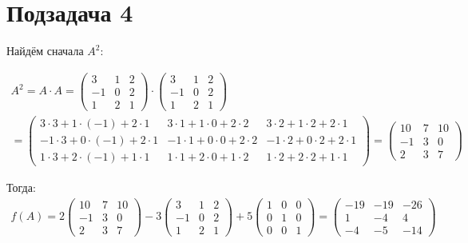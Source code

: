 \documentclass[12pt, a4paper]{article}
\begin{document}
    \newpage
    \newpage
    
    \section{Подзадача 4}

    Найдём сначала $A^2$:

    \begin{multline}
        A^2 = A \cdot A = \left(\begin{matrix}
            3 & 1 & 2 \\
            -1 & 0 & 2 \\
            1 & 2 & 1
        \end{matrix}\right) \cdot \left(\begin{matrix}
            3 & 1 & 2 \\
            -1 & 0 & 2 \\
            1 & 2 & 1
        \end{matrix}\right) \\ = \left(\begin{matrix}
            3\cdot 3+1\cdot \left(-1\right)+2\cdot 1 & 3\cdot 1+1\cdot 0+2\cdot 2 & 3\cdot 2+1\cdot 2+2\cdot 1 \\
            -1\cdot 3+0\cdot \left(-1\right)+2\cdot 1 & -1\cdot 1+0\cdot 0+2\cdot 2 & -1\cdot 2+0\cdot 2+2\cdot 1 \\
            1\cdot 3+2\cdot \left(-1\right)+1\cdot 1 & 1\cdot 1+2\cdot 0+1\cdot 2 & 1\cdot 2+2\cdot 2+1\cdot 1
            \end{matrix}\right) = \left(\begin{matrix}
                10 & 7 & 10 \\
                -1 & 3 & 0 \\
                2 & 3 & 7
            \end{matrix}\right)
    \end{multline}

    Тогда:
    \begin{multline}
        f(A) = 2 \left(\begin{matrix}
            10 & 7 & 10 \\
            -1 & 3 & 0 \\
            2 & 3 & 7
        \end{matrix}\right) − 3 \left(\begin{matrix}
            3 & 1 & 2 \\
            -1 & 0 & 2 \\
            1 & 2 & 1
        \end{matrix}\right) + 5 \left(\begin{matrix}
            1 & 0 & 0 \\
            0 & 1 & 0 \\
            0 & 0 & 1
        \end{matrix}\right) = \left(\begin{matrix}
            -19 & -19 & -26 \\
            1 & -4 & 4 \\
            -4 & -5 & -14
        \end{matrix}\right)
    \end{multline}
    
\end{document}
